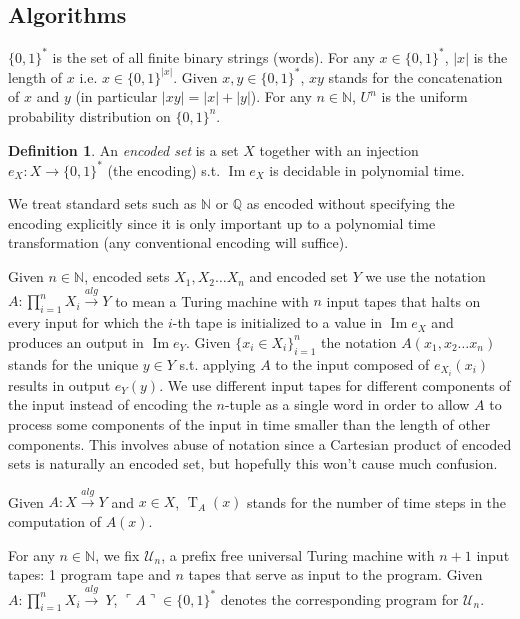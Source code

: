 \documentclass{article}
\theoremstyle{definition}
\newtheorem{definition}{Definition}[section]
\theoremstyle{plain}
\newcommand{\Words}{{\{ 0, 1 \}^*}}
\newcommand{\WordsLen}[1]{{\{ 0, 1 \}^{#1}}}
\DeclareMathOperator{\Img}{Im}
\DeclareMathOperator{\T}{T}
\newcommand{\Nats}{\mathbb{N}}
\newcommand{\Rats}{\mathbb{Q}}
\newcommand{\Abs}[1]{\lvert #1 \rvert}
\newcommand{\Quote}[1]{\ulcorner #1 \urcorner}
\begin{document}
\subsection{Algorithms}

$\Words$ is the set of all finite binary strings (words). For any $x \in \Words$, $\Abs{x}$ is the length of $x$ i.e. $x \in \WordsLen{\Abs{x}}$. Given $x,y \in \Words$, $xy$ stands for the concatenation of $x$ and $y$ (in particular $\Abs{xy}=\Abs{x}+\Abs{y}$). For any $n \in \Nats$, $U^n$ is the uniform probability distribution on $\WordsLen{n}$.

\begin{definition}

An \emph{encoded set} is a set $X$ together with an injection $e_X: X \rightarrow \Words$ (the encoding) s.t. $\Img e_X$ is decidable in polynomial time.

\end{definition}

We treat standard sets such as $\Nats$ or $\Rats$ as encoded without specifying the encoding explicitly since it is only important up to a polynomial time transformation (any conventional encoding will suffice).

Given $n \in \Nats$, encoded sets $X_1, X_2 \ldots X_n$ and encoded set $Y$ we use the notation $A: \prod_{i=1}^n X_i \xrightarrow{alg} Y$ to mean a Turing machine with $n$ input tapes that halts on every input for which the $i$-th tape is initialized to a value in $\Img e_X$ and produces an output in $\Img e_Y$. Given $\{x_i \in X_i\}_{i=1}^n$ the notation $A(x_1, x_2 \ldots x_n)$ stands for the unique $y \in Y$ s.t. applying $A$ to the input composed of $e_{X_i}(x_i)$ results in output $e_Y(y)$. We use different input tapes for different components of the input instead of encoding the $n$-tuple as a single word in order to allow $A$ to process some components of the input in time smaller than the length of other components. This involves abuse of notation since a Cartesian product of encoded sets is naturally an encoded set, but hopefully this won't cause much confusion.

Given $A: X \xrightarrow{alg} Y$ and $x \in X$, $\T_A(x)$ stands for the number of time steps in the computation of $A(x)$.

For any $n \in \Nats$, we fix $\mathcal{U}_n$, a prefix free universal Turing machine with $n+1$ input tapes: 1 program tape and $n$ tapes that serve as input to the program. Given $A: \prod_{i=1}^n X_i \xrightarrow{alg}\ Y$, $\Quote{A} \in \Words$ denotes the corresponding program for $\mathcal{U}_n$.
\end{document}
